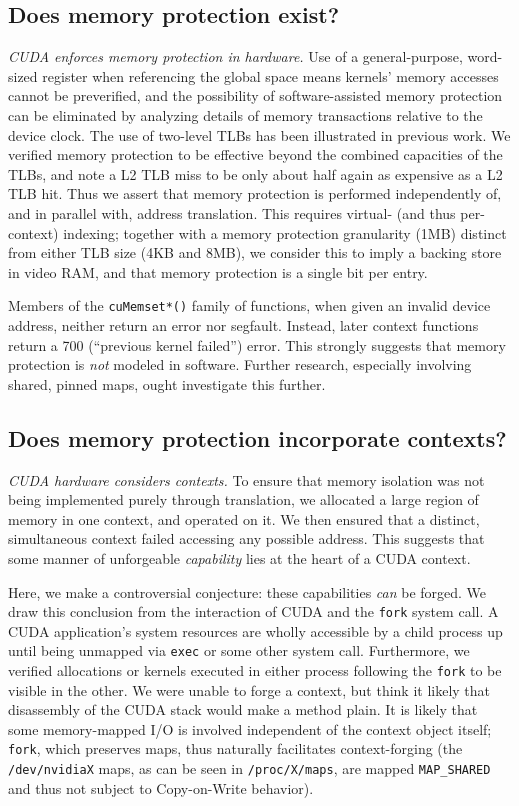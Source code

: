 \documentclass[letterpaper,10pt]{article}
\begin{document}
\begin{multicols}{2}
\subsection{Does memory protection exist?}
\textit{CUDA enforces memory protection in hardware.} Use of a general-purpose,
word-sized register when referencing the global space means kernels' memory
accesses cannot be preverified, and the possibility of software-assisted memory
protection can be eliminated by analyzing details of memory transactions
relative to the device clock\cite{microbenchmarks}. The use of two-level TLBs
has been illustrated in previous work\cite{demmel}. We verified memory
protection to be effective beyond the combined capacities of the TLBs, and
note a L2 TLB miss to be only about half again as expensive as a L2 TLB hit.
Thus we assert that memory protection is performed independently of, and in
parallel with, address translation. This requires virtual- (and thus per-context)
indexing; together with a memory protection granularity (1MB) distinct from
either TLB size (4KB and 8MB), we consider this to imply a backing store in
video RAM, and that memory protection is a single bit per entry.

Members of the \texttt{cuMemset*()} family of functions, when given an invalid device address,
neither return an error nor segfault. Instead, later context functions return
a 700 (``previous kernel failed'') error. This strongly suggests that memory
protection is \textit{not} modeled in software. Further research, especially
involving shared, pinned maps, ought investigate this further.
\subsection{Does memory protection incorporate contexts?}
\textit{CUDA hardware considers contexts.} To ensure that memory isolation
was not being implemented purely through translation, we allocated a large
region of memory in one context, and operated on it. We then ensured that a
distinct, simultaneous context failed accessing any possible address. This
suggests that some manner of unforgeable \textit{capability}\cite{capability}
lies at the heart of a CUDA context.

Here, we make a controversial conjecture: these capabilities \textit{can}
be forged. We draw this conclusion from the interaction of CUDA and the \texttt{fork}
system call. A CUDA application's system resources are wholly accessible by a
child process up until being unmapped via \texttt{exec} or some other system call.
Furthermore, we verified allocations or kernels executed in either process following the
\texttt{fork} to be visible in the other. We were unable to forge a context,
but think it likely that disassembly of the CUDA stack would make a method plain.
It is likely that some memory-mapped I/O is involved independent of the context
object itself; \texttt{fork}, which preserves maps, thus naturally facilitates
context-forging (the \texttt{/dev/nvidiaX} maps, as can be seen in \texttt{/proc/X/maps},
are mapped \texttt{MAP\_SHARED} and thus not subject to Copy-on-Write behavior).

\end{multicols}
\end{document}
